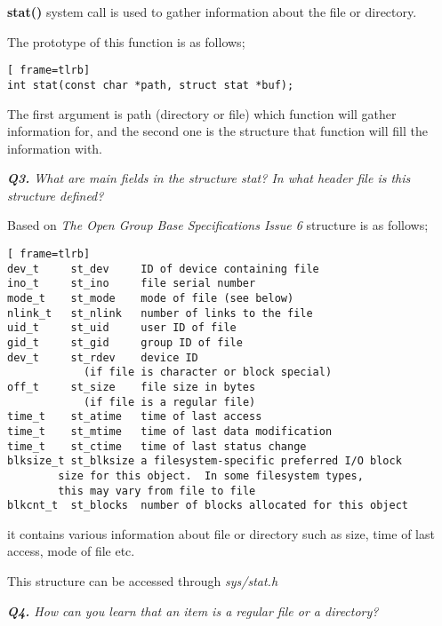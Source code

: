 \documentclass[11pt]{article}
\begin{document}
\textbf{stat()} system call is used to gather information about the file or directory. 

The prototype of this function is as follows;

\vspace{5mm}
\begin{minipage}{1\textwidth}
\begin{lstlisting}[ frame=tlrb]
int stat(const char *path, struct stat *buf);
\end{lstlisting}
\end{minipage}

The first argument is path (directory or file) which function will gather information for, and the second one is the structure that function will fill the information with.

\vspace{5mm}
\textit{\textbf{Q3.} What are main fields in the structure stat? In what header file is this structure defined?}
\vspace{5mm}

Based on \textit{The Open Group Base Specifications Issue 6} structure is as follows;

\vspace{5mm}
\begin{minipage}{1\textwidth}
\begin{lstlisting}[ frame=tlrb]
dev_t     st_dev     ID of device containing file
ino_t     st_ino     file serial number
mode_t    st_mode    mode of file (see below)
nlink_t   st_nlink   number of links to the file
uid_t     st_uid     user ID of file
gid_t     st_gid     group ID of file
dev_t     st_rdev    device ID 
			(if file is character or block special)
off_t     st_size    file size in bytes 
			(if file is a regular file)
time_t    st_atime   time of last access
time_t    st_mtime   time of last data modification
time_t    st_ctime   time of last status change
blksize_t st_blksize a filesystem-specific preferred I/O block 
		size for this object.  In some filesystem types,
		this may vary from file to file
blkcnt_t  st_blocks  number of blocks allocated for this object
\end{lstlisting}
\end{minipage}

it contains various information about file or directory such as size, time of last access, mode of file etc.

This structure can be accessed through \textit{sys/stat.h}

\vspace{5mm}
\textit{\textbf{Q4.} How can you learn that an item is a regular file or a directory?}
\vspace{5mm}
\end{document}
